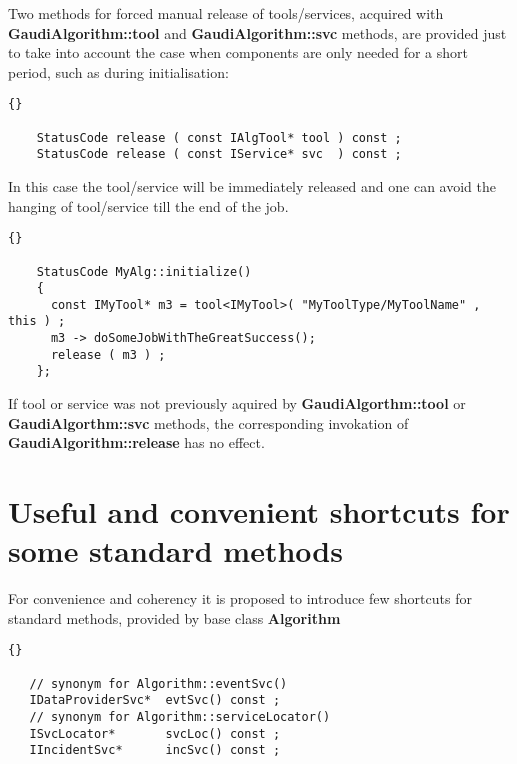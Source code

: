 \documentclass{lhcbnote}
\newcommand{\bftt}         {\ttfamily\bfseries}
\begin{document}
Two methods for forced manual release of tools/services,
acquired with {\bftt{GaudiAlgorithm::tool}} and
{\bftt{GaudiAlgorithm::svc}} methods, are provided just to
take into account the case when components are only needed
for a short period, such as during initialisation:

\begin{scriptsize}
  \begin{lstlisting}{}

    StatusCode release ( const IAlgTool* tool ) const ;
    StatusCode release ( const IService* svc  ) const ;

  \end{lstlisting}
\end{scriptsize}

In this case the tool/service will be immediately released and
one can avoid the hanging of tool/service till the end of
the job.

\begin{scriptsize}
  \begin{lstlisting}{}

    StatusCode MyAlg::initialize()
    {
      const IMyTool* m3 = tool<IMyTool>( "MyToolType/MyToolName" , this ) ;
      m3 -> doSomeJobWithTheGreatSuccess();
      release ( m3 ) ;
    };

  \end{lstlisting}
\end{scriptsize}

If tool or service was not previously aquired by
{\bftt{GaudiAlgorthm::tool}} or {\bftt{GaudiAlgorthm::svc}}
methods, the corresponding invokation of
{\bftt{GaudiAlgorithm::release}} has no effect.



\section{Useful and convenient  shortcuts for some standard methods}

For convenience and coherency it is proposed
to introduce few shortcuts for standard methods, provided by
base class {\bftt{Algorithm}}

\begin{scriptsize}
 \begin{lstlisting}{}

   // synonym for Algorithm::eventSvc()
   IDataProviderSvc*  evtSvc() const ;
   // synonym for Algorithm::serviceLocator()
   ISvcLocator*       svcLoc() const ;
   IIncidentSvc*      incSvc() const ;

 \end{lstlisting}
\end{scriptsize}
\end{document}
